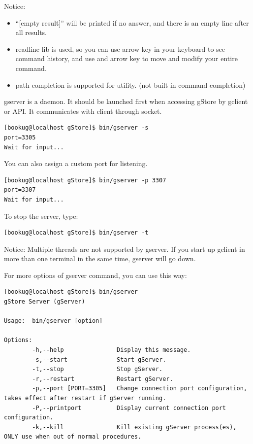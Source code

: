 \documentclass[titlepage, a4paper, 12pt]{article}
\begin{document}
Notice:

\begin{itemize}
\item
  ``{[}empty result{]}'' will be printed if no answer, and there is an
  empty line after all results.
\item
  readline lib is used, so you can use arrow key in your keyboard to see
  command history, and use and arrow key to move and modify your entire
  command.
\item
  path completion is supported for utility. (not built-in command
  completion)
\end{itemize}


gserver is a daemon. It should be launched first when accessing gStore
by gclient or API. It communicates with client through socket.

\begin{verbatim}
[bookug@localhost gStore]$ bin/gserver -s
port=3305
Wait for input...
\end{verbatim}

You can also assign a custom port for listening.

\begin{verbatim}
[bookug@localhost gStore]$ bin/gserver -p 3307
port=3307
Wait for input...
\end{verbatim}

To stop the server, type:
\begin{verbatim}
[bookug@localhost gStore]$ bin/gserver -t
\end{verbatim}

Notice: Multiple threads are not supported by gserver. If you start up
gclient in more than one terminal in the same time, gserver will go
down.

For more options of gserver command, you can use this way:
\begin{verbatim}
[bookug@localhost gStore]$ bin/gserver
gStore Server (gServer)

Usage:  bin/gserver [option]

Options:
		-h,--help               Display this message.
		-s,--start              Start gServer.
		-t,--stop               Stop gServer.
		-r,--restart            Restart gServer.
		-p,--port [PORT=3305]   Change connection port configuration, takes effect after restart if gServer running.
		-P,--printport          Display current connection port configuration.
		-k,--kill               Kill existing gServer process(es), ONLY use when out of normal procedures.
\end{verbatim}
\end{document}
